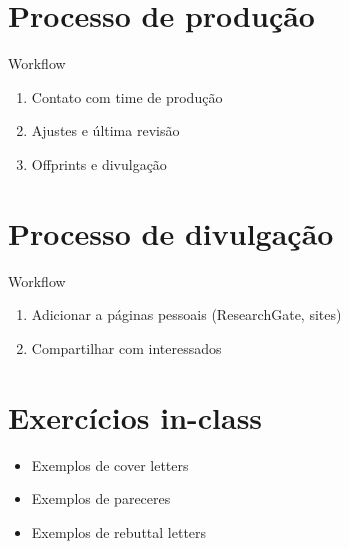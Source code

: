 \section{Processo de produção}

\begin{frame}{Workflow}
\begin{enumerate}
\item Contato com time de produção
\item Ajustes e última revisão
\item Offprints e divulgação
\end{enumerate}
\end{frame}

\section{Processo de divulgação}

\begin{frame}{Workflow}
\begin{enumerate}
\item Adicionar a páginas pessoais (ResearchGate, sites)
\item Compartilhar com interessados
\end{enumerate}
\end{frame}

\section{Exercícios in-class}

\begin{frame}
\begin{itemize}
\item Exemplos de cover letters 
\item Exemplos de pareceres
\item Exemplos de rebuttal letters 
\end{itemize}
\end{frame}
